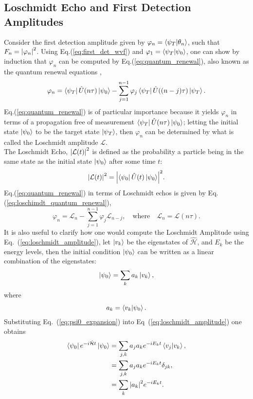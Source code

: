 \documentclass[12pt]{article}
\numberwithin{equation}{section}
\renewcommand{\H}{\mathcal{\hat{H}}}
\newcommand{\1}{\mathbb{1}}
\newcommand{\state}{\ket{\psi_T}}
\newcommand{\projection}{\bra{\psi_T}}
\begin{document}
\subsection{Loschmidt Echo and First Detection Amplitudes}
Consider the first detection amplitude given by $\varphi_n=\projection\ket{\theta_n}$, such that $F_n=\abs{\varphi_n}^2$. Using Eq.(\ref{eq:first_det_wvf}) and $\varphi_1=\projection\ket{\psi_0}$, one can show by induction that $\varphi_n$ can be computed by Eq.(\ref{eq:quantum_renewal}), also known as the quantum renewal equations \cite{barkai},
\begin{equation}\label{eq:quantum_renewal}
    \varphi_n=\projection\hat{U}(n\tau)\ket{\psi_0}-\sum_{j=1}^{n-1}\varphi_j\projection\hat{U}((n-j)\tau)\state.   
\end{equation}
Eq.(\ref{eq:quantum_renewal}) is of particular importance because it yields $\varphi_n$ in terms of a propagation free of measurement $\projection\hat{U}(n\tau)\ket{\psi_0}$; letting the initial state $\ket{\psi_0}$ to be the target state $\state$, then $\varphi_n$ can be determined by what is called the Loschmidt amplitude $\mathcal{L}$.
\\
The Loschmidt Echo, $\abs{\mathcal{L}(t)}^2$ is defined as the probability a particle being in the same state as the initial state $\ket{\psi_0}$ after some time $t$:
\begin{equation}\label{eq:loschmidt_amplitude}
    \abs{\mathcal{L}(t)}^2=\abs{\bra{\psi_0}\hat{U}(t)\ket{\psi_0}}^2.
\end{equation}
Eq.(\ref{eq:quantum_renewal}) in terms of Loschmidt echos is given by Eq.(\ref{eq:loschimdt_quantum_renewal}),
\begin{equation}\label{eq:loschimdt_quantum_renewal}
    \varphi_n=\mathcal{L}_n-\sum_{j=1}^{n-1}\varphi_j\mathcal{L}_{n-j}, \quad \text{where} \quad \mathcal{L}_n=\mathcal{L}(n\tau).
\end{equation}
It is also useful to clarify how one would compute the Loschmidt Amplitude using Eq.~(\ref{eq:loschmidt_amplitude}), let $\ket{v_k}$ be the eigenstates of $\H$, and $E_k$ be the energy levels, then the initial condition $\ket{\psi_0}$ can be written as a linear combination of the eigenstates:
\begin{equation}\label{eq:psi0_expansion}
    \ket{\psi_0}=\sum_k a_k \ket{v_k},
\end{equation}
where 
\begin{equation}
    a_k=\braket{v_k}{\psi_0}.
\end{equation}
Substituting Eq.~(\ref{eq:psi0_expansion}) into Eq~(\ref{eq:loschmidt_amplitude}) one obtains
\begin{align}
    \bra{\psi_0}e^{-i\H t}\ket{\psi_0}&=\sum_{j,k} a_j a_k e^{-iE_kt}\braket{v_j}{v_k},
    \\
    &=\sum_{j,k} a_j a_k e^{-iE_kt}\delta_{jk},
    \\
    &=\sum_k \abs{a_k}^2 e^{-iE_kt}. \label{eq:loschmidt_amplitude_practice}
\end{align}
\end{document}
